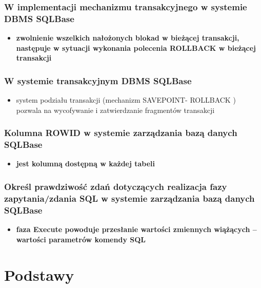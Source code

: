 \documentclass[a4paper,twoside]{article}
\begin{document}
  \section{W implementacji mechanizmu transakcyjnego w systemie DBMS SQLBase}
      \begin{itemize}
      \item \textbf{zwolnienie wszelkich nałożonych blokad w bieżącej transakcji, następuje w sytuacji wykonania polecenia ROLLBACK w bieżącej transakcji}
      \end{itemize}

  \section{W systemie transakcyjnym DBMS SQLBase}
      \begin{itemize}
      \item system podziału transakcji (mechanizm SAVEPOINT- ROLLBACK ) pozwala na wycofywanie i zatwierdzanie fragmentów transakcji
      \end{itemize}

  \section{Kolumna ROWID w systemie zarządzania bazą danych SQLBase}
      \begin{itemize}
      \item \textbf{jest kolumną dostępną w każdej tabeli}
      \end{itemize}

  \section{Określ prawdziwość zdań dotyczących realizacja fazy zapytania/zdania SQL w systemie zarządzania bazą danych SQLBase}
      \begin{itemize}
      \item \textbf{faza Execute powoduje przesłanie wartości zmiennych wiążących – wartości parametrów komendy SQL}
      \end{itemize}


  \part*{Podstawy}
\end{document}
